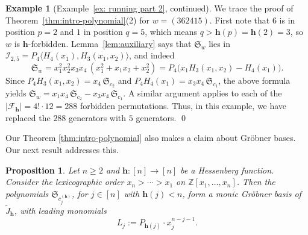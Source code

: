 \documentclass[11pt]{amsart}
\theoremstyle{plain}
\newtheorem{prop}[thm]{Proposition}
\theoremstyle{definition}
\newtheorem{ex}[thm]{Example}
\newcommand{\hess}{{\mathbf h}}
\newcommand{\Z}{\mathbb{ Z}}           %
\newcommand{\exampleqed}{%
    {   
    \renewcommand{\qedsymbol}{$\lozenge$}%
    \qed%
    }
}
\numberwithin{equation}{section}
\begin{document}
\begin{ex}[Example~\ref{ex: running part 2}, continued]\label{ex: running part 3}
We trace the proof of Theorem~\ref{thm:intro-polynomial}(2) for $w=(362415)$. First note that $6$ is in position $p=2$ and $1$ in position $q=5$, which means $q > \hess(p)=\hess(2)=3$, so $w$ is $\hess$-forbidden. Lemma~\ref{lem:auxiliary} says that  $\mathfrak{S}_w$ lies in $\mathcal{I}_{2,5}=P_4\langle H_4(x_1),H_3(x_1,x_2)\rangle$, and indeed 
\[
\mathfrak{S}_w=x_1^2x_2^2x_3x_4\,(x_1^2+x_1x_2+x_2^2)=P_4\bigl(x_1H_3(x_1,x_2)-H_4(x_1)\bigr).
\]
Since $P_4H_3(x_1,x_2)=x_4\,\mathfrak{S}_{c_2}$ and $P_4H_4(x_1)=x_3x_4\,\mathfrak{S}_{c_1}$, the above formula yields $\mathfrak{S}_w=x_1x_4\,\mathfrak{S}_{c_2}-x_3x_4\,\mathfrak{S}_{c_1}$. A similar argument applies to each of the $|\mathcal{F}_\hess|=4!\cdot 12=288$ forbidden permutations. Thus, in this example, we have replaced the $288$ generators with $5$ generators. 
\exampleqed
\end{ex}



Our Theorem \ref{thm:intro-polynomial} also makes a claim about Gr\"obner bases. Our next result addresses this. 


\begin{prop}\label{prop:grobner}
Let $n\geq 2$ and $\hess:[n]\to[n]$ be a Hessenberg function. Consider the lexicographic order $x_n>\cdots>x_1$ on $\Z[x_1,\ldots,x_n]$. Then the polynomials $\mathfrak{S}_{c_j^{(\hess)}}$, for $j\in[n]$ with $\hess(j)<n$, form a monic Gr\"obner basis of $\tilde{J}_\hess$, with leading monomials
\[
L_j := P_{\hess(j)} \cdot x_j^{n-j-1}.
\]
\end{prop}
\end{document}
